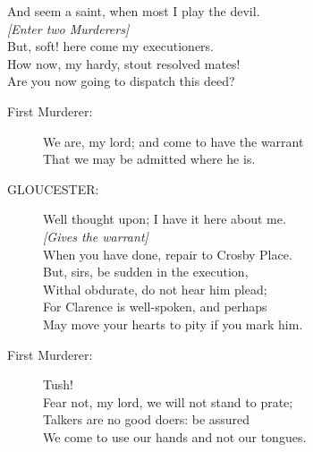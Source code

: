 \documentclass{article}
\begin{document}
\begin{description}
\hspace{1pt}And seem a saint, when most I play the devil.\\
{\it [Enter two Murderers]}\\
\hspace{1pt}But, soft! here come my executioners.\\
\hspace{1pt}How now, my hardy, stout resolved mates!\\
\hspace{1pt}Are you now going to dispatch this deed?\\
\end{description}
\begin{description}
\item[First Murderer:] 
\hspace{1pt}We are, my lord; and come to have the warrant\\
\hspace{1pt}That we may be admitted where he is.\\
\end{description}
\begin{description}
\item[GLOUCESTER:] 
\hspace{1pt}Well thought upon; I have it here about me.\\
{\it [Gives the warrant]}\\
\hspace{1pt}When you have done, repair to Crosby Place.\\
\hspace{1pt}But, sirs, be sudden in the execution,\\
\hspace{1pt}Withal obdurate, do not hear him plead;\\
\hspace{1pt}For Clarence is well-spoken, and perhaps\\
\hspace{1pt}May move your hearts to pity if you mark him.\\
\end{description}
\begin{description}
\item[First Murderer:] 
\hspace{1pt}Tush!\\
\hspace{1pt}Fear not, my lord, we will not stand to prate;\\
\hspace{1pt}Talkers are no good doers: be assured\\
\hspace{1pt}We come to use our hands and not our tongues.\\
\end{description}
\end{document}
